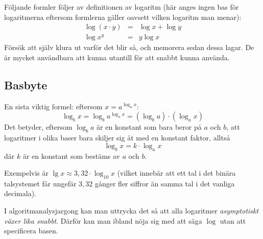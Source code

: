 \documentclass[a4paper]{article}
\begin{document}
Följande formler följer av definitionen av logaritm (här anges ingen bas för logaritmerna eftersom formlerna gäller oavsett vilken
logaritm man menar):
\begin{eqnarray*}
  \log (x\cdot y) &=& \log x + \log y \\
  \log x^y &=& y\log x
\end{eqnarray*}
Försök att själv klura ut varför det blir så, och memorera sedan dessa
lagar. De är mycket användbara att kunna utantill för att snabbt kunna använda.

\subsection*{Basbyte}
\label{sec:org08d5dc3}

En sista viktig formel: eftersom \(x = a^{\log_a x}\):
\[\log_b x = \log_b a^{\log_a x} = (\log_b a)\cdot (\log_a x)\]
Det betyder, eftersom \(\log_b a\) är en konstant som bara beror på \(a\) och \(b\),
att logaritmer i olika baser bara skiljer sig åt med en konstant faktor, alltså
\[\log_b x = k\cdot \log_a x\]
där \(k\) är en konstant som bestäms av \(a\) och \(b\).

Exempelvis är \(\lg x \approx 3,32\cdot\log_{10}x\) (vilket innebär att ett tal i
det binära talsystemet får ungefär \(3,32\) gånger fler siffror än samma tal i det vanliga decimala).

I algoritmanalysjargong kan man uttrycka det så att alla logaritmer
\emph{asymptotiskt växer lika snabbt}. Därför kan man ibland nöja sig med att säga
\(\log\) utan att specificera basen.
\end{document}
